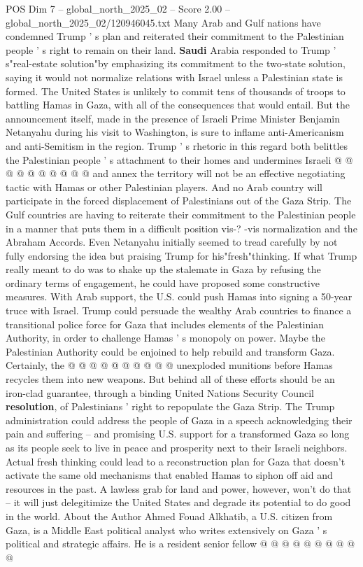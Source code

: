 \begin{textsample}{POS Dim 7 – global\_north\_2025\_02 – Score 2.00 – global\_north\_2025\_02/120946045.txt}
Many Arab and Gulf nations have condemned Trump ' s plan and reiterated their commitment to the Palestinian people ' s right to remain on their land. \textbf{Saudi} Arabia responded to Trump ' s"real-estate solution"by emphasizing its commitment to the two-state solution, saying it would not normalize relations with Israel unless a Palestinian state is formed.
The United States is unlikely to commit tens of thousands of troops to battling Hamas in Gaza, with all of the consequences that would entail.
But the announcement itself, made in the presence of Israeli Prime Minister Benjamin Netanyahu during his visit to Washington, is sure to inflame anti-Americanism and anti-Semitism in the region.
Trump ' s rhetoric in this regard both belittles the Palestinian people ' s attachment to their homes and undermines Israeli @ @ @ @ @ @ @ @ @ @ and annex the territory will not be an effective negotiating tactic with Hamas or other Palestinian players.
And no Arab country will participate in the forced displacement of Palestinians out of the Gaza Strip.
The Gulf countries are having to reiterate their commitment to the Palestinian people in a manner that puts them in a difficult position vis-? -vis normalization and the Abraham Accords.
Even Netanyahu initially seemed to tread carefully by not fully endorsing the idea but praising Trump for his"fresh"thinking.
If what Trump really meant to do was to shake up the stalemate in Gaza by refusing the ordinary terms of engagement, he could have proposed some constructive measures.
With Arab support, the U.S. could push Hamas into signing a 50-year truce with Israel.
Trump could persuade the wealthy Arab countries to finance a transitional police force for Gaza that includes elements of the Palestinian Authority, in order to challenge Hamas ' s monopoly on power.
Maybe the Palestinian Authority could be enjoined to help rebuild and transform Gaza.
Certainly, the @ @ @ @ @ @ @ @ @ @ unexploded munitions before Hamas recycles them into new weapons.
But behind all of these efforts should be an iron-clad guarantee, through a binding United Nations Security Council \textbf{resolution}, of Palestinians ' right to repopulate the Gaza Strip.
The Trump administration could address the people of Gaza in a speech acknowledging their pain and suffering -- and promising U.S. support for a transformed Gaza so long as its people seek to live in peace and prosperity next to their Israeli neighbors.
Actual fresh thinking could lead to a reconstruction plan for Gaza that doesn't activate the same old mechanisms that enabled Hamas to siphon off aid and resources in the past.
A lawless grab for land and power, however, won't do that -- it will just delegitimize the United States and degrade its potential to do good in the world.
About the Author Ahmed Fouad Alkhatib, a U.S. citizen from Gaza, is a Middle East political analyst who writes extensively on Gaza ' s political and strategic affairs.
He is a resident senior fellow @ @ @ @ @ @ @ @ @ @

\end{textsample}
